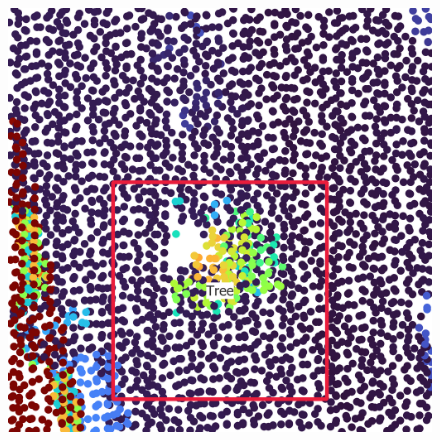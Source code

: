 \documentclass[
  letterpaper,
  DIV=11,
  numbers=noendperiod]{scrartcl}
\begin{document}
\begin{figure}
\begin{minipage}{0.48\linewidth}
\end{minipage}%
\newline
\begin{minipage}{\linewidth}
~\end{minipage}%
\newline
\begin{minipage}{0.48\linewidth}

\includegraphics{images/Data_shift/LiDAR.png}

\end{minipage}%
%
\begin{minipage}{0.04\linewidth}
~\end{minipage}%
%
\begin{minipage}{0.48\linewidth}


\end{minipage}
\end{figure}
\end{document}
